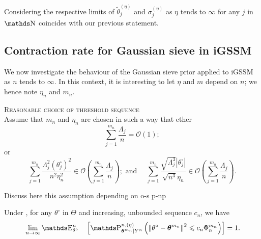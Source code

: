 Considering the respective limits of $\widetilde{\theta}^{(\eta)}_{j}$ and $\sigma^{(\eta)}_{j}$ as $\eta$ tends to $\infty$ for any $j$ in $\N$ coincides with our previous statement.

\subsection{Contraction rate for Gaussian sieve in iGSSM}\label{BAYES_GAUSS_CONTRACT}
We now investigate the behaviour of the Gaussian sieve prior applied to iGSSM as $n$ tends to $\infty$.
In this context, it is interesting to let $\eta$ and $m$ depend on $n$; we hence note $\eta_{n}$ and $m_{n}$.

\medskip

\begin{as}{\textsc{Reasonable choice of threshold sequence} \\ }\label{AS_BAYES_GAUSS_CONTRACT_THRESHOLD}
Assume that $m_{n}$ and $\eta_{n}$ are chosen in such a way that ether
\[ \sum\limits_{j = 1}^{m_{n}} \frac{\Lambda_{j}}{n} = \mathcal{O}(1); \]
or
\[\sum\limits_{j = 1}^{m_{n}} \frac{\Lambda_{j}^{2} \left(\theta_{j}^{\circ}\right)^{2}}{n^{2} \eta_{n}^{2}} \in \mathcal{O}\left(\sum\limits_{j = 1}^{m_{n}} \frac{\Lambda_{j}}{n}\right); \text{ and } \quad \sum\limits_{j = 1}^{m_{n}} \frac{\sqrt{\Lambda_{j}^{3}} \left\vert\theta_{j}^{\circ}\right\vert}{\sqrt{n^{3}} \eta_{n}} \in \mathcal{O}\left(\sum\limits_{j = 1}^{m_{n}} \frac{\Lambda_{j}}{n}\right).\]
\end{as}

\begin{il}
Discuss here this assumption depending on o-s p-np

\ilEnd
\end{il}

\begin{cor}\label{COR_BAYES_GAUSS_CONTRACT_SIEVE}
Under , for any $\theta^{\circ}$ in $\Theta$ and increasing, unbounded sequence $c_{n}$, we have
\begin{alignat*}{3}
& && \lim\limits_{n \rightarrow \infty} \E_{\theta^{\circ}}^{n}&&\left[\P_{\boldsymbol{\theta}^{m_{n}}\vert Y^{n}}^{n, (\eta)}\left(\left\Vert \theta^{\circ} - \boldsymbol{\theta}^{m_{n}}\right\Vert^{2} \leq c_{n} \Phi^{m_{n}}_{n} \right)\right] = 1.
\end{alignat*}
\end{cor}

